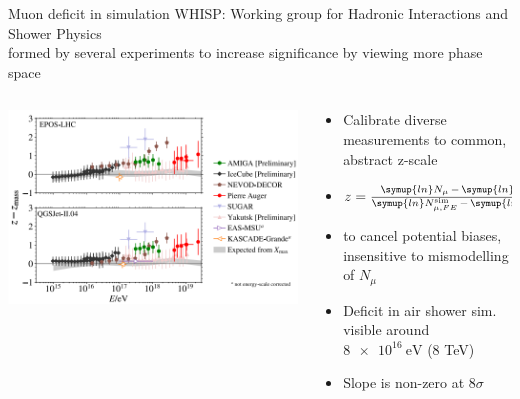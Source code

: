 \documentclass[aspectratio=1610, 9pt]{beamer}
\begin{document}
\begin{frame}{Muon deficit in simulation}
  WHISP: Working group for Hadronic Interactions and Shower Physics \\
  formed by several experiments to increase significance by viewing more phase space \\
  \begin{columns}
    \begin{column}[c]{0.48\textwidth}
      \includegraphics[width=\textwidth]{plots/z_zmass.png}
    \end{column}
    \begin{column}[c]{0.48\textwidth}
      \begin{itemize}
        \item Calibrate diverse measurements to common, abstract z-scale
        \item $z = \frac{\symup{ln}N_\mu \,-\, \symup{ln}N_{\mu,p}^\text{sim}}
        {\symup{ln}N_{\mu,FE}^\text{sim} \,-\, \symup{ln}N_{\mu,p}^\text{sim}}$
        \item to cancel potential biases, insensitive to mismodelling of $N_{\mu}$
        \item Deficit in air shower sim. visible around $\SI{8e16}{\electronvolt}$ (8 TeV)
        \item Slope is non-zero at 8$\sigma$
      \end{itemize}
    \end{column}
  \end{columns}
\end{frame}
\end{document}
